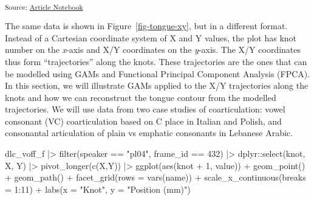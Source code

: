 \documentclass[
]{interact}
\newenvironment{Shaded}{\begin{snugshade}}{\end{snugshade}}
\newcommand{\AttributeTok}[1]{\textcolor[rgb]{0.40,0.45,0.13}{#1}}
\newcommand{\DecValTok}[1]{\textcolor[rgb]{0.68,0.00,0.00}{#1}}
\newcommand{\FunctionTok}[1]{\textcolor[rgb]{0.28,0.35,0.67}{#1}}
\newcommand{\NormalTok}[1]{\textcolor[rgb]{0.00,0.23,0.31}{#1}}
\newcommand{\SpecialCharTok}[1]{\textcolor[rgb]{0.37,0.37,0.37}{#1}}
\newcommand{\StringTok}[1]{\textcolor[rgb]{0.13,0.47,0.30}{#1}}
\begin{document}
\textsubscript{Source:
\href{https://stefanocoretta.github.io/mv_uti/index.qmd.html}{Article
Notebook}}

The same data is shown in Figure~\ref{fig-tongue-xy}, but in a different
format. Instead of a Cartesian coordinate system of X and Y values, the
plot has knot number on the \emph{x}-axis and X/Y coordinates on the
\emph{y}-axis. The X/Y coordinates thus form ``trajectories'' along the
knots. These trajectories are the ones that can be modelled using GAMs
and Functional Principal Component Analysis (FPCA). In this section, we
will illustrate GAMs applied to the X/Y trajectories along the knots and
how we can reconstruct the tongue contour from the modelled
trajectories. We will use data from two case studies of coarticulation:
vowel consonant (VC) coarticulation based on C place in Italian and
Polish, and consonantal articulation of plain vs emphatic consonants in
Lebanese Arabic.

\label{cell-fig-tongue-xy}
\begin{Shaded}
\begin{Highlighting}[]
\NormalTok{dlc\_voff\_f }\SpecialCharTok{|\textgreater{}} 
  \FunctionTok{filter}\NormalTok{(speaker }\SpecialCharTok{==} \StringTok{"pl04"}\NormalTok{, frame\_id }\SpecialCharTok{==} \DecValTok{432}\NormalTok{) }\SpecialCharTok{|\textgreater{}} 
\NormalTok{  dplyr}\SpecialCharTok{::}\FunctionTok{select}\NormalTok{(knot, X, Y) }\SpecialCharTok{|\textgreater{}} 
  \FunctionTok{pivot\_longer}\NormalTok{(}\FunctionTok{c}\NormalTok{(X,Y)) }\SpecialCharTok{|\textgreater{}} 
  \FunctionTok{ggplot}\NormalTok{(}\FunctionTok{aes}\NormalTok{(knot }\SpecialCharTok{+} \DecValTok{1}\NormalTok{, value)) }\SpecialCharTok{+}
  \FunctionTok{geom\_point}\NormalTok{() }\SpecialCharTok{+}
  \FunctionTok{geom\_path}\NormalTok{() }\SpecialCharTok{+}
  \FunctionTok{facet\_grid}\NormalTok{(}\AttributeTok{rows =} \FunctionTok{vars}\NormalTok{(name)) }\SpecialCharTok{+}
  \FunctionTok{scale\_x\_continuous}\NormalTok{(}\AttributeTok{breaks =} \DecValTok{1}\SpecialCharTok{:}\DecValTok{11}\NormalTok{) }\SpecialCharTok{+}
  \FunctionTok{labs}\NormalTok{(}\AttributeTok{x =} \StringTok{"Knot"}\NormalTok{, }\AttributeTok{y =} \StringTok{"Position (mm)"}\NormalTok{)}
\end{Highlighting}
\end{Shaded}
\end{document}
